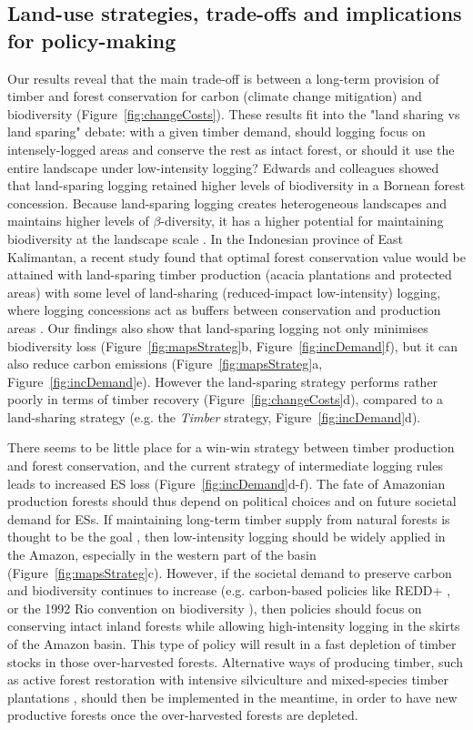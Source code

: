 \documentclass{article}
\begin{document}
\subsection{Land-use strategies, trade-offs and implications for policy-making}

Our results reveal that the main trade-off is between a long-term provision of timber and forest conservation for carbon (climate change mitigation) and biodiversity (Figure~\ref{fig:changeCosts}). These results fit into the "land sharing vs land sparing" debate: with a given timber demand, should logging focus on intensely-logged areas and conserve the rest as intact forest, or should it use the entire landscape under low-intensity logging? Edwards and colleagues \cite{Edwards2014} showed that land-sparing logging retained higher levels of biodiversity in a Bornean forest concession. Because land-sparing logging creates heterogeneous landscapes and maintains higher levels of $\beta$-diversity, it has a higher potential for maintaining biodiversity at the landscape scale \cite{DeCastroSolar2015}. 
In the Indonesian province of East Kalimantan, a recent study found that optimal forest conservation value would be attained with land-sparing timber production (acacia plantations and protected areas) with some level of land-sharing (reduced-impact low-intensity) logging, where logging concessions act as buffers between conservation and production areas \cite{Runting2018}. 
Our findings also show that land-sparing logging not only minimises biodiversity loss (Figure~\ref{fig:mapsStrateg}b, Figure~\ref{fig:incDemand}f), but it can also reduce carbon emissions (Figure~\ref{fig:mapsStrateg}a, Figure~\ref{fig:incDemand}e). 
However the land-sparing strategy performs rather poorly in terms of timber recovery (Figure~\ref{fig:changeCosts}d), compared to a land-sharing strategy (e.g. the \textit{Timber} strategy, Figure~\ref{fig:incDemand}d). 

There seems to be little place for a win-win strategy between timber production and forest conservation, and the current strategy of intermediate logging rules leads to increased ES loss (Figure~\ref{fig:incDemand}d-f). The fate of Amazonian production forests should thus depend on political choices and on future societal demand for ESs. If maintaining long-term timber supply from natural forests is thought to be the goal \cite{Zarin2007}, then low-intensity logging should be widely applied in the Amazon, especially in the western part of the basin (Figure~\ref{fig:mapsStrateg}c).
However, if the societal demand to preserve carbon and biodiversity continues to increase (e.g. carbon-based policies like REDD+ \cite{Stickler2009}, or the 1992 Rio convention on biodiversity \cite{Barton1992}), then policies should focus on conserving intact inland forests while allowing high-intensity logging in the skirts of the Amazon basin. This type of policy will result in a fast depletion of timber stocks in those over-harvested forests. Alternative ways of producing timber, such as active forest restoration with intensive silviculture and mixed-species timber plantations \cite{Lamb2005}, should then be implemented in the meantime, in order to have new productive forests once the over-harvested forests are depleted. 
\end{document}
